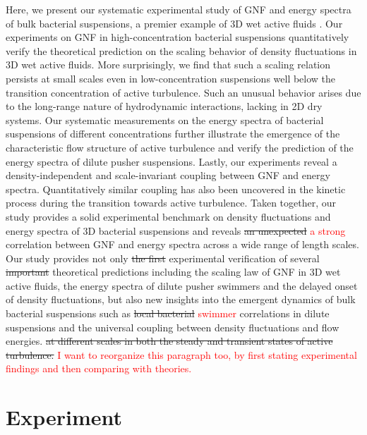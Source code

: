 \documentclass[twocolumn,aps,prx,amsmath,amssymb,longbibliography,superscriptaddress]{revtex4-2}
\begin{document}
Here, we present our systematic experimental study of GNF and energy spectra of bulk bacterial suspensions, a premier example of 3D wet active fluids \cite{Marchetti2013}. Our experiments on GNF in high-concentration bacterial suspensions quantitatively verify the theoretical prediction on the scaling behavior of density fluctuations in 3D wet active fluids. More surprisingly, we find that such a scaling relation persists at small scales even in low-concentration suspensions well below the transition concentration of active turbulence. Such an unusual behavior arises due to the long-range nature of hydrodynamic interactions, lacking in 2D dry systems. Our systematic measurements on the energy spectra of bacterial suspensions of different concentrations further illustrate the emergence of the characteristic flow structure of active turbulence and verify the prediction of the energy spectra of dilute pusher suspensions. Lastly, our experiments reveal a density-independent and scale-invariant coupling between GNF and energy spectra. Quantitatively similar coupling has also been uncovered in the kinetic process during the transition towards active turbulence. Taken together, our study provides a solid experimental benchmark on density fluctuations and energy spectra of 3D bacterial suspensions and reveals \sout{an unexpected} \textcolor{red}{a strong} correlation between GNF and energy spectra across a wide range of length scales. Our study provides not only \sout{the first} experimental verification of several \sout{important} theoretical predictions including the scaling law of GNF in 3D wet active fluids, the energy spectra of dilute pusher swimmers and the delayed onset of density fluctuations, but also new insights into the emergent dynamics of bulk bacterial suspensions such as \sout{local bacterial} \textcolor{red}{swimmer} correlations in dilute suspensions and the universal coupling between density fluctuations and flow energies. \sout{at different scales in both the steady and transient states of active turbulence.} \textcolor{red}{I want to reorganize this paragraph too, by first stating experimental findings and then comparing with theories.}

\section{Experiment}
\end{document}

